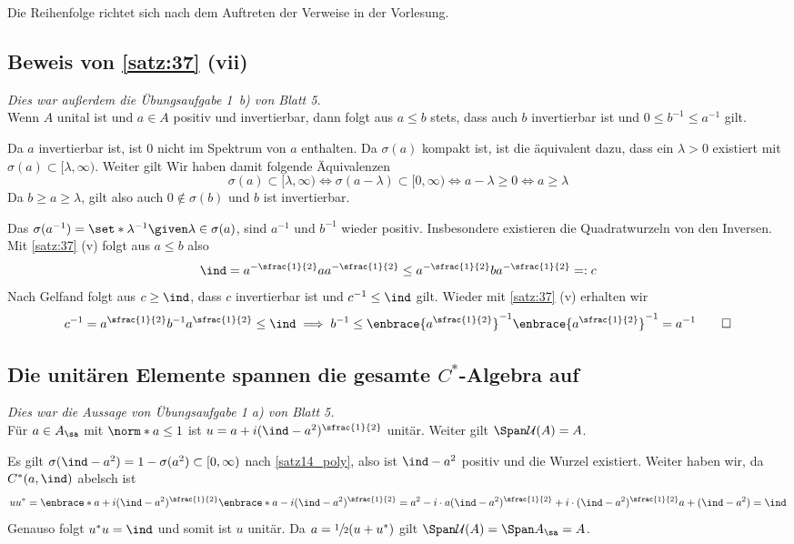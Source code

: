 Die Reihenfolge richtet sich nach dem Auftreten der Verweise in der Vorlesung.

\subsection{Beweis von \autoref{satz:37} (vii)} %
\label{sub:beweis_37_vii}
\emph{Dies war außerdem die Übungsaufgabe 1~b) von Blatt 5.} \smallskip\\
Wenn $A$ unital ist und $a \in A$ positiv und invertierbar, dann folgt aus $a \le b$ stets, dass auch $b$ invertierbar ist und $0 \le b^{-1} \le a^{-1}$ gilt.
\begin{beweis}
	Da $a$ invertierbar ist, ist $0$ nicht im Spektrum von $a$ enthalten.
	Da $\sigma(a)$ kompakt ist, ist die äquivalent dazu, dass ein $\lambda>0$ existiert mit $\sigma(a) \subset [\lambda,\infty)$.
	Weiter gilt
	Wir haben damit folgende Äquivalenzen
	\[
		\sigma(a) \subset [\lambda,\infty) \iff \sigma(a-\lambda) \subset [0,\infty) \iff a- \lambda\ge 0 \iff a \ge \lambda
	\]
	Da $b\ge a \ge \lambda$, gilt also auch $0 \notin \sigma(b)$ und $b$ ist invertierbar.
	
	Das $\sigma(a^{-1}) = \set*{\lambda^{-1} \given \lambda \in  \sigma(a)}$, sind $a^{-1}$ und $b ^{-1}$ wieder positiv.
	Insbesondere existieren die Quadratwurzeln von den Inversen. 
	Mit \autoref{satz:37} (v) folgt aus $a \le b$ also 
	\[
		\ind=a^{-\sfrac{1}{2}} a a^{- \sfrac{1}{2}} \le a^{-\sfrac{1}{2}} b a^{-\sfrac{1}{2}} =: c
	\]
	Nach Gelfand folgt aus $c \ge \ind$, dass $c$ invertierbar ist und $c^{-1} \le \ind$ gilt. Wieder mit \autoref{satz:37} (v) erhalten wir
	\[
		c^{-1} = a^{\sfrac{1}{2}}b^{-1}a^{\sfrac{1}{2}} \le \ind \implies b^{-1} \le \enbrace{a^{\sfrac{1}{2}}}^{-1} \enbrace{a^{\sfrac{1}{2}}}^{-1} =a^{-1} \qedhere
	\]
\end{beweis}

\subsection{Die unitären Elemente spannen die gesamte $C^*$-Algebra auf} %
\label{sub:span_unitaer}
\emph{Dies war die Aussage von Übungsaufgabe 1 a) von Blatt 5.}\smallskip\\
Für $a \in A_\sa$ mit $\norm*{a} \le 1$ ist $u= a + i (\ind-a^2)^{\sfrac{1}{2}}$ unitär.
Weiter gilt $\Span \mathcal{U}(A)=A$.
\begin{beweis}
	Es gilt $\sigma(\ind -a^2) = 1 - \sigma(a^2) \subset [0,\infty)$ nach \autoref{satz14_poly}, also ist $\ind -a^2$ positiv und die Wurzel existiert.
	Weiter haben wir, da $C^*(a, \ind)$ abelsch ist
	\[
		uu^* = \enbrace*{a+ i (\ind-a^2)^{\sfrac{1}{2}}} \enbrace*{a- i (\ind -a^2)^{\sfrac{1}{2}}} = a^2 - i \cdot a(\ind-a^2)^{\sfrac{1}{2}} + i \cdot (\ind-a^2)^{\sfrac{1}{2}}a + (\ind-a^2)=\ind
	\]
	Genauso folgt $u^*u=\ind$ und somit ist $u$ unitär.
	Da $a= \sfrac{1}{2}(u+u^*)$ gilt $\Span\mathcal{U}(A)=\Span A_\sa=A$. 
\end{beweis}


